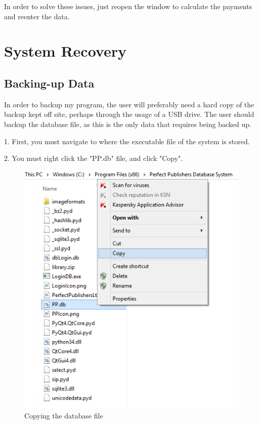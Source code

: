 In order to solve these issues, just reopen the window to calculate the payments and reenter the data.


\section{System Recovery}

\subsection{Backing-up Data}

In order to backup my program, the user will preferably need a hard copy of the backup kept off site, perhaps through the usage of a USB drive. The user should backup the database file, as this is the only data that requires being backed up.

1. First, you must navigate to where the executable file of the system is stored.

2. You must right click the "PP.db" file, and click "Copy".

\begin{figure}[H]
    \includegraphics[width=\textwidth]{./Manual/CopyDB.png}
    \caption{Copying the database file}
\end{figure}

